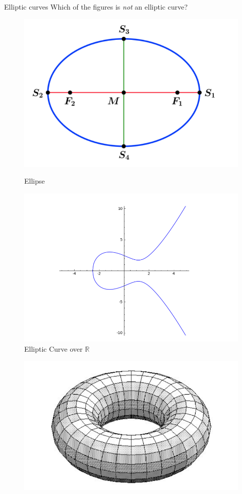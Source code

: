 \documentclass{beamer}
\begin{document}
\begin{frame}{Elliptic curves}
	Which of the figures is \textit{not} an elliptic curve?
\begin{figure}
	\begin{minipage}{0.48\textwidth}
		\centering
		\includegraphics[width=.7\linewidth]{ellipse}
		\caption{Ellipse}\label{fig:ellipse}
	\end{minipage}\hfill
	\begin{minipage}{0.48\textwidth}
		\centering
		\includegraphics[width=.7\linewidth]{elliptic_curve}
		\caption{Elliptic Curve over $\mathbb{R}$}\label{fig:elliptic_curve}
	\end{minipage}
\end{figure}
\begin{figure}
	\begin{minipage}{0.48\textwidth}
		\centering
		\includegraphics[width=.7\linewidth]{elliptic_curve_c}

\end{minipage}
\end{figure}
\end{frame}
\end{document}
